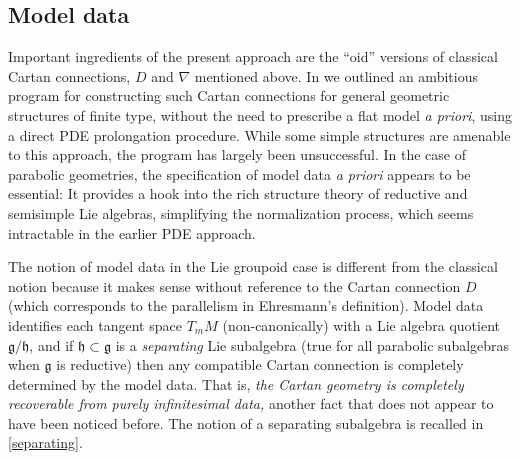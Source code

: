 \documentclass[leqno,12pt]{amsart} %
\begin{document}
\subsection{Model data}\label{role}
Important ingredients of the present approach are the ``oid'' versions of classical Cartan
connections, $D$ and $\nabla $ mentioned above. In \cite{Blaom_12} we outlined an
ambitious program for constructing such Cartan connections for general geometric
structures of finite type, without the need to prescribe a flat model {\em a priori},
using a direct PDE prolongation procedure. While some simple structures are amenable to
this approach, the program has largely been unsuccessful. In the case of parabolic
geometries, the specification of model data {\em a priori} appears to be essential: It
provides a hook into the rich structure theory of reductive and semisimple Lie algebras,
simplifying the normalization process, which seems intractable in the earlier PDE
approach.

The notion of model data in the Lie groupoid case is different from the classical notion
because it makes sense without reference to the Cartan connection $D$ (which corresponds
to the parallelism in Ehresmann's definition). Model data identifies each tangent space
$T_mM$ (non-canonically) with a Lie algebra quotient ${\mathfrak g}/{\mathfrak h}$, and if
${\mathfrak h} \subset {\mathfrak g} $ is a {\em separating} Lie subalgebra (true for all
parabolic subalgebras when ${\mathfrak g} $ is reductive) then any compatible Cartan
connection is completely determined by the model data. That is, {\em the Cartan geometry
  is completely recoverable from purely infinitesimal data,} another fact that does not
appear to have been noticed before. The notion of a separating subalgebra is recalled in
\ref{separating}.

\end{document}
